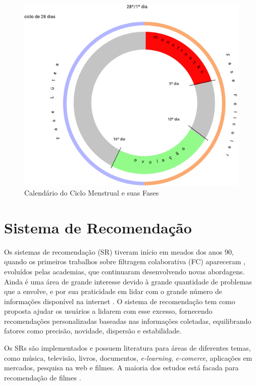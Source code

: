 \begin{figure}[ht]
	\caption{Calendário do Ciclo Menstrual e suas Fases}
	\begin{center}
	\includegraphics[keepaspectratio=true,scale=0.4]{figuras/Group1.pdf}
	\end{center}
    \label{fig02}
\end{figure}

\section{Sistema de Recomendação}
 
Os sistemas de recomendação (SR) tiveram início em meados dos anos 90, 
quando os primeiros trabalhos sobre filtragem colaborativa (FC) 
apareceram \cite{felferning2008}, evoluídos pelas academias, 
que continuaram desenvolvendo novas abordagens. 
Ainda é uma área de grande interesse devido à grande quantidade de 
problemas que a envolve, e por sua praticidade em lidar com o grande 
número de informações disponível na internet \cite{adomavicius2005}. 
O sistema de recomendação tem como proposta ajudar os usuários a lidarem com esse 
excesso, fornecendo recomendações personalizadas baseadas nas informações 
coletadas, equilibrando fatores como precisão, novidade, dispersão e 
estabilidade\cite{bobadilla2013}.


Os SRs são implementados e possuem literatura 
para áreas de diferentes temas, como música, televisão, livros, 
documentos, \emph{e-learning}, \emph{e-comerce}, aplicações em mercados, 
pesquisa na web e filmes. A maioria dos estudos está facada 
para recomendação de filmes \cite{bobadilla2013}.
 
